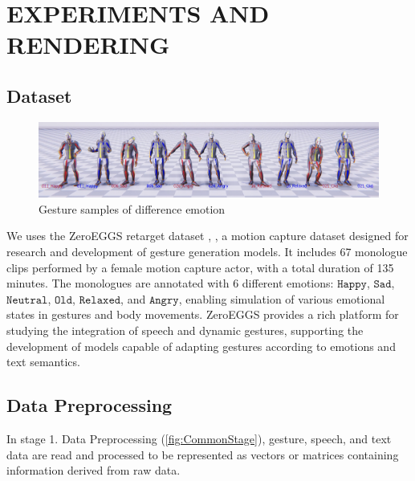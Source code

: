 
\section{EXPERIMENTS AND RENDERING}
\label{sec:results}


\subsection{Dataset}


\begin{figure}[htbp]
	\centering
	\includegraphics[width=\linewidth]{figures/DifferenceEmotion}
	\caption{Gesture samples of difference emotion}
\end{figure}

We uses the ZeroEGGS retarget dataset \cite{ghorbani2022zeroeggs}, \cite{ghorbani2022zeroeggszeroshotexamplebasedgesture}, a motion capture dataset designed for research and development of gesture generation models. It includes 67 monologue clips performed by a female motion capture actor, with a total duration of 135 minutes. The monologues are annotated with 6 different emotions: $\texttt{Happy}$, $\texttt{Sad}$, $\texttt{Neutral}$, $\texttt{Old}$, $\texttt{Relaxed}$, and $\texttt{Angry}$, enabling simulation of various emotional states in gestures and body movements. ZeroEGGS provides a rich platform for studying the integration of speech and dynamic gestures, supporting the development of models capable of adapting gestures according to emotions and text semantics.

\subsection{Data Preprocessing}
\label{sec:Preprocessing}

In stage {1. Data Preprocessing} (\autoref{fig:CommonStage}), gesture, speech, and text data are read and processed to be represented as vectors or matrices containing information derived from raw data.

